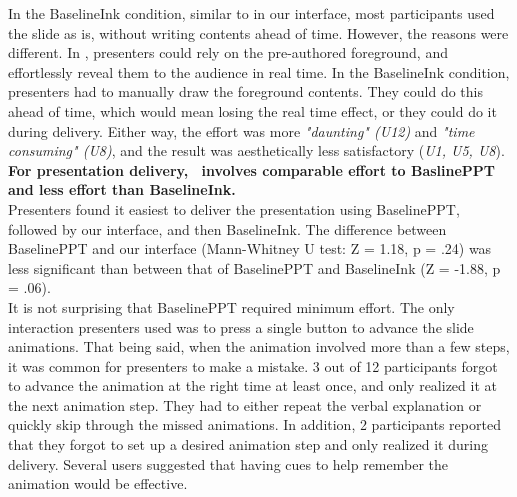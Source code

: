 In the BaselineInk condition, similar to in our interface, most participants used the slide as is, without writing contents ahead of time. However, the reasons were different. In \interface, presenters could rely on the pre-authored foreground, and effortlessly reveal them to the audience in real time. In the BaselineInk condition, presenters had to manually draw the foreground contents. They could do this ahead of time, which would mean losing the real time effect, or they could do it during delivery. Either way, the effort was more \textit{"daunting"  (U12)} and  \textit{"time consuming" (U8)}, and the result was aesthetically less satisfactory (\textit{U1, U5, U8}).  \\
%
\textbf{For presentation delivery, \interface\ involves comparable effort to BaslinePPT and less effort than BaselineInk.}\\
Presenters found it easiest to deliver the presentation using BaselinePPT, followed by our interface, and then BaselineInk. The difference between BaselinePPT and our interface (Mann-Whitney U test: Z = 1.18, p = .24) was less significant than between that of BaselinePPT and BaselineInk (Z = -1.88, p = .06). \\
It is not surprising that BaselinePPT required minimum effort. The only interaction presenters used was to press a single button to advance the slide animations. That being said, when the animation involved more than a few steps, it was common for presenters to make a mistake. 3 out of 12 participants forgot to advance the animation at the right time at least once, and only realized it at the next animation step. They had to either repeat the verbal explanation or quickly skip through the missed animations. In addition, 2 participants reported that they forgot to set up a desired animation step and only realized it during delivery. Several users suggested that having cues to help remember the animation would be effective.\\

